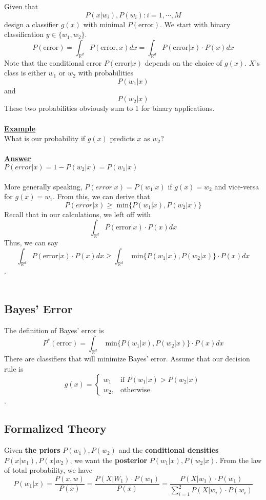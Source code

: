 \documentclass[12pt]{article}
\newcommand{\skln}{\\[\baselineskip]}
\newcommand{\aside}[1]{\noindent\textbf{\underline{#1}}\skln}
\begin{document}
Given that \[P(x|w_i), P(w_i) : i=1, \cdots, M\] design a classifier $g(x)$ with minimal $P(\text{error})$. We start with binary classification $y \in \{w_1, w_2\}$. \[P(\text{error}) = \int_{\mathbb{R}^d} P(\text{error}, x)dx = \int_{\mathbb{R}^d} P(\text{error} | x) \cdot P(x) dx\]Note that the conditional error $P(\text{error} | x)$ depends on the choice of $g(x)$. $X$'s class is either $w_1$ or $w_2$ with probabilities \[P(w_1 | x)\] and \[P(w_2 | x)\]These two probabilities obviously sum to 1 for binary applications.
\\ \\
\aside{Example} What is our probability if $g(x)$ predicts $x$ as $w_2$?
\\ \\
\aside{Answer} $P(error | x) = 1 - P(w_2 | x) = P(w_1 | x)$
\\ \\
More generally speaking, $P(error | x) = P(w_1 | x)$ if $g(x) = w_2$ and vice-versa for $g(x) = w_1$. From this, we can derive that \[P(error | x) \geq\text{ min}\{P(w_1 | x), P(w_2 | x)\}\]Recall that in our calculations, we left off with \[\int_{\mathbb{R}^d} P(\text{error} | x) \cdot P(x) dx\]Thus, we can say \[\int_{\mathbb{R}^d} P(\text{error} | x) \cdot P(x) dx \geq \int_{\mathbb{R}^d}\text{ min}\{P(w_1 | x), P(w_2 | x)\} \cdot P(x) dx\]. \\ \\
\subsection{Bayes' Error}

The definition of Bayes' error is \[P^{*}(\text{error}) = \int_{\mathbb{R}^d}\text{ min}\{P(w_1 | x), P(w_2 | x)\} \cdot P(x) dx\] There are classifiers that will minimize Bayes' error. Assume that our decision rule is 
\[ g(x) = 
\begin{cases}
    w_1 & \text{if } P(w_1|x) > P(w_2 | x)\\
    w_2,              & \text{otherwise}
\end{cases}
\]
.

\subsection{Formalized Theory}

Given \textbf{the priors} $P(w_1), P(w_2)$ and the \textbf{conditional densities} $P(x | w_1), P(x | w_2)$, we want the \textbf{posterior} $P(w_1 | x), P(w_2 | x)$. From the law of total probability, we have
\[
P(w_1 | x) = \frac{P(x, w)}{P(x)} = \frac{P(X | W_1) \cdot P(w_1)}{P(x)} = \frac{P(X | w_1) \cdot P(w_1)}{\sum \limits_{i=1}^{2} P(X | w_i) \cdot P(w_i)}
\]
\end{document}
